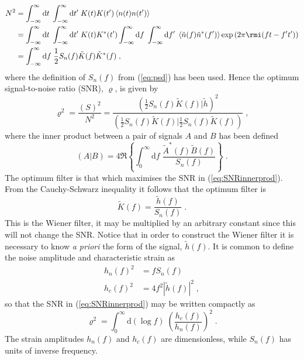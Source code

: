 \begin{eqnarray} 
N^{2}&=\int_{-\infty}^{\infty}\mathrm{d}t\;\int_{-\infty}^{\infty}\mathrm{d}t'\;K(t)K(t')\left<n(t)n(t')\right> \nonumber \\
&=\int_{-\infty}^{\infty}\mathrm{d}t\;\int_{-\infty}^{\infty}\mathrm{d}t'\;K(t)K^{*}(t')\int_{-\infty}^{\infty}\mathrm{d}f\;\int_{-\infty}^{\infty}\mathrm{d}f'\;\left<\tilde{n}(f)\tilde{n}^{*}(f')\right>\exp\left(2\pi\rmi(ft-f't')\right)\nonumber \\
&=\int_{-\infty}^{\infty}\mathrm{d}f \; \frac{1}{2}S_{n}(f)\tilde{K}(f)\tilde{K}^{*}(f) \; ,
 \end{eqnarray}
where the definition of $S_{n}(f)$ from (\ref{eq:psd}) has been used. Hence the optimum signal-to-noise ratio (SNR), $\varrho$, is given by
\begin{equation}\label{eq:SNRinnerprod} 
\varrho^{2}= \frac{(S)^{2}}{N^{2}}= \frac{\left( \frac{1}{2}S_{n}(f)\tilde{K}(f) \Big| \tilde{h} \right)^{2}}{\left( \frac{1}{2}S_{n}(f)\tilde{K}(f) \Big| \frac{1}{2}S_{n}(f)\tilde{K}(f) \right)} \;,
\end{equation}
where the inner product between a pair of signals $A$ and $B$ has been defined
\begin{equation}\label{eq:snrinnerprod} \left( A | B \right) = 4\Re\left\{\int_{0}^{\infty}\mathrm{d}f\;\frac{\tilde{A}^{*}(f)\tilde{B}(f)}{S_{n}(f)}\right\} \; .\end{equation}
The optimum filter is that which maximises the SNR in (\ref{eq:SNRinnerprod}). From the Cauchy-Schwarz inequality it follows that the optimum filter is
\begin{equation} \tilde{K}(f)=\frac{\tilde{h}(f)}{S_{n}(f)} \; . \end{equation}
This is the Wiener filter, it may be multiplied by an arbitrary constant since this will not change the SNR. Notice that in order to construct the Wiener filter it is necessary to know \emph{a priori} the form of the signal, $\tilde{h}(f)$. It is common to define the noise amplitude and characteristic strain as
\begin{eqnarray}\label{eq:strains} h_{n}(f)^{2}&=fS_{n}(f) \\
\label{eq:strains1} \label{eq:strainsagain}               h_{c}(f)^{2}&=4f^{2}\left| \tilde{h}(f) \right|^{2} \; , \end{eqnarray}
so that the SNR in (\ref{eq:SNRinnerprod}) may be written compactly as
\begin{equation}\label{eq:hc} 
\varrho^{2}=\int_{0}^{\infty} \mathrm{d}\left(\log f\right)\; \left(\frac{h_{c}(f)}{h_{n}(f)}\right)^{2} \;.
\end{equation}
The strain amplitudes $h_{n}(f)$ and $h_{c}(f)$ are dimensionless, while $S_{n}(f)$ has units of inverse frequency.

